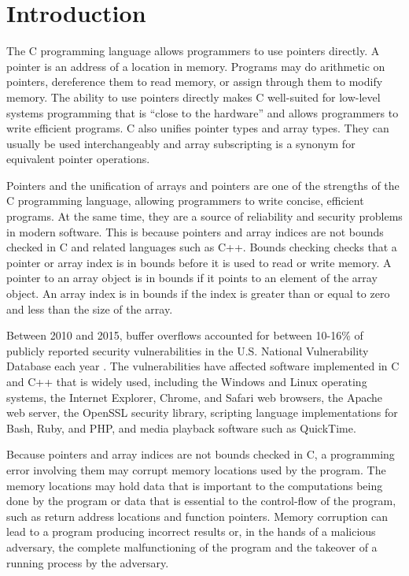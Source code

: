 
\chapter{Introduction}
\label{chapter:introduction}

The C programming language \cite{Ritchie1988, ISO2011} allows programmers to use 
pointers directly. A pointer is an address of a location in memory. Programs may do
arithmetic on pointers, dereference them to read memory, or assign
through them to modify memory. The ability to use pointers directly
makes C well-suited for low-level systems programming that is ``close to
the hardware'' and allows programmers to write efficient programs. C
also unifies pointer types and array types. They can usually be used
interchangeably and array subscripting is a synonym for equivalent
pointer operations.

Pointers and the unification of arrays and pointers are one of the
strengths of the C programming language, allowing programmers to write
concise, efficient programs. At the same time, they are a source of
reliability and security problems in modern software. This is
because pointers and array indices are not bounds checked in C and
related languages such as C++. Bounds checking checks that a pointer or
array index is in bounds before it is used to read or write memory. A
pointer to an array object is in bounds if it points to an element of
the array object. An array index is in bounds if the index is greater
than or equal to zero and less than the size of the array.

Between 2010 and 2015, buffer overflows accounted for between 10-16\% of
publicly reported security vulnerabilities in the U.S. National
Vulnerability Database each year \cite{NIST2015}. The vulnerabilities have affected
software implemented in C and C++ that is widely used, including the
Windows and Linux operating systems, the Internet Explorer, Chrome, and
Safari web browsers, the Apache web server, the OpenSSL security
library, scripting language implementations for Bash, Ruby, and PHP, and
media playback software such as QuickTime.

Because pointers and array indices are not bounds checked in C, a
programming error involving them may corrupt memory locations used by
the program. The memory locations may hold data that is important to the
computations being done by the program or data that is essential to the
control-flow of the program, such as return address locations and
function pointers. Memory corruption can lead to a program producing
incorrect results or, in the hands of a malicious adversary, the
complete malfunctioning of the program and the takeover of a running
process by the adversary.

